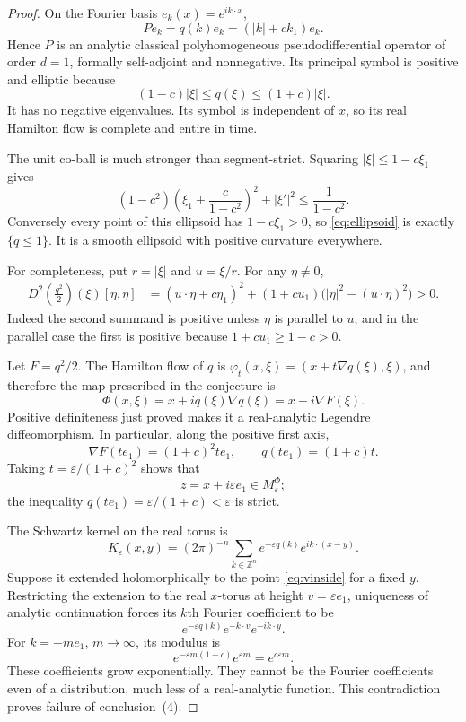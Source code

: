 \documentclass[11pt]{article}
\theoremstyle{remark}
\newcommand{\Z}{\mathbb Z}
\newcommand{\eps}{\varepsilon}
\begin{document}
\begin{proof}
On the Fourier basis $e_k(x)=e^{ik\cdot x}$,
\[
 Pe_k=q(k)e_k=(|k|+ck_1)e_k.
\]
Hence $P$ is an analytic classical polyhomogeneous pseudodifferential operator
of order $d=1$, formally self-adjoint and nonnegative.  Its principal symbol
is positive and elliptic because
\[
 (1-c)|\xi|\leq q(\xi)\leq(1+c)|\xi|.
\]
It has no negative eigenvalues.  Its symbol is independent of $x$, so its
real Hamilton flow is complete and entire in time.

The unit co-ball is much stronger than segment-strict.  Squaring
$|\xi|\leq1-c\xi_1$ gives
\begin{equation}\label{eq:ellipsoid}
 (1-c^2)\left(\xi_1+\frac{c}{1-c^2}\right)^2
 +|\xi'|^2\leq\frac1{1-c^2}.
\end{equation}
Conversely every point of this ellipsoid has $1-c\xi_1>0$, so
\eqref{eq:ellipsoid} is exactly $\{q\leq1\}$.  It is a smooth ellipsoid with
positive curvature everywhere.

For completeness, put $r=|\xi|$ and $u=\xi/r$.  For any $\eta\neq0$,
\begin{align*}
 D^2\left(\frac{q^2}{2}\right)(\xi)[\eta,\eta]
 &=(u\cdot\eta+c\eta_1)^2
 +(1+cu_1)\bigl(|\eta|^2-(u\cdot\eta)^2\bigr)>0.
\end{align*}
Indeed the second summand is positive unless $\eta$ is parallel to $u$, and
in the parallel case the first is positive because $1+cu_1\geq1-c>0$.

Let $F=q^2/2$.  The Hamilton flow of $q$ is
$\varphi_t(x,\xi)=(x+t\nabla q(\xi),\xi)$, and therefore the map prescribed in
the conjecture is
\begin{equation}\label{eq:randersPhi}
 \Phi(x,\xi)=x+i q(\xi)\nabla q(\xi)=x+i\nabla F(\xi).
\end{equation}
Positive definiteness just proved makes it a real-analytic Legendre
diffeomorphism.  In particular, along the positive first axis,
\[
 \nabla F(te_1)=(1+c)^2t e_1,
 \qquad q(te_1)=(1+c)t.
\]
Taking $t=\eps/(1+c)^2$ shows that
\begin{equation}\label{eq:vinside}
 z=x+i\eps e_1\in M_\eps^\Phi;
\end{equation}
the inequality $q(te_1)=\eps/(1+c)<\eps$ is strict.

The Schwartz kernel on the real torus is
\begin{equation}\label{eq:randerskernel}
 K_\eps(x,y)=(2\pi)^{-n}\sum_{k\in\Z^n}
 e^{-\eps q(k)}e^{ik\cdot(x-y)}.
\end{equation}
Suppose it extended holomorphically to the point \eqref{eq:vinside} for a
fixed $y$.  Restricting the extension to the real $x$-torus at height
$v=\eps e_1$, uniqueness of analytic continuation forces its $k$th Fourier
coefficient to be
\[
 e^{-\eps q(k)}e^{-k\cdot v}e^{-ik\cdot y}.
\]
For $k=-me_1$, $m\to\infty$, its modulus is
\[
 e^{-\eps m(1-c)}e^{\eps m}=e^{c\eps m}.
\]
These coefficients grow exponentially.  They cannot be the Fourier
coefficients even of a distribution, much less of a real-analytic function.
This contradiction proves failure of conclusion~(4).
\end{proof}
\end{document}

